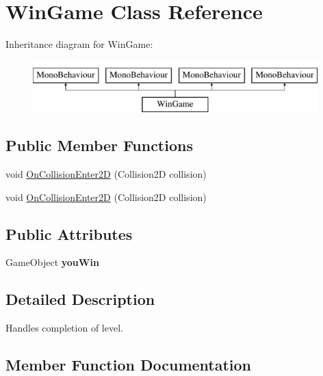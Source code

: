 \hypertarget{class_win_game}{}\section{Win\+Game Class Reference}
\label{class_win_game}
Inheritance diagram for Win\+Game\+:\begin{figure}[H]
\begin{center}
\leavevmode
\includegraphics[height=2.000000cm]{class_win_game}
\end{center}
\end{figure}
\subsection*{Public Member Functions}
\begin{DoxyCompactItemize}
\item 
void \mbox{\hyperlink{class_win_game_a20f3871fd050c6da54d041b49a7fb063}{On\+Collision\+Enter2D}} (Collision2D collision)
\item 
void \mbox{\hyperlink{class_win_game_a20f3871fd050c6da54d041b49a7fb063}{On\+Collision\+Enter2D}} (Collision2D collision)
\end{DoxyCompactItemize}
\subsection*{Public Attributes}
\begin{DoxyCompactItemize}
\item 
\mbox{\label{class_win_game_a786a1f699b803e4eafe16804002e4f18}} 
Game\+Object {\bfseries you\+Win}
\end{DoxyCompactItemize}


\subsection{Detailed Description}
Handles completion of level. 

\subsection{Member Function Documentation}
\mbox{\label{class_win_game_a20f3871fd050c6da54d041b49a7fb063}} 

